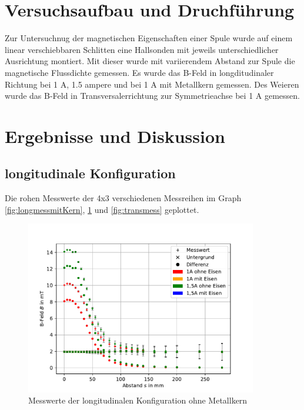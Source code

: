 \documentclass[11pt, a4paper]{article}
\begin{document}
    \section{Versuchsaufbau und Druchführung}
    Zur Untersuchnug der magnetischen Eigenschaften einer Spule wurde auf einem linear verschiebbaren Schlitten eine Hallsonden mit jeweils unterschiedlicher Ausrichtung montiert.
    Mit dieser wurde mit variierendem Abstand zur Spule die magnetische Flussdichte gemessen. Es wurde das B-Feld in longditudinaler Richtung bei 1 \si{\ampere}, 1.5 \si{ampere} und bei 1 \si{\ampere} mit Metallkern gemessen.
    Des Weieren wurde das B-Feld in Transversalerrichtung zur Symmetrieachse bei 1 \si{\ampere} gemessen.
    \section{Ergebnisse und Diskussion}
    \subsection{longitudinale Konfiguration}
    Die rohen Messwerte der 4x3 verschiedenen Messreihen im Graph \ref{fig:longmessmitKern}, \ref{fig:longmessohneKern} und \ref{fig:transmess} geplottet.
    \begin{figure}[h]
        \centering
        \includegraphics[width=0.9\textwidth]{ohneKernRaw.pdf}
        \caption{Messwerte der longitudinalen Konfiguration ohne Metallkern}
        \label{fig:longmessohneKern}
    \end{figure}
\end{document}
